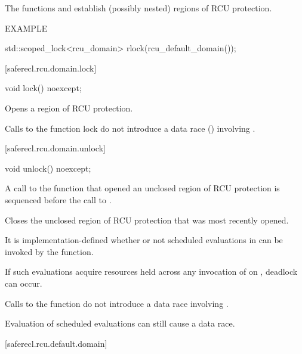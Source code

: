 The functions  and  establish (possibly nested)
regions of RCU protection.

EXAMPLE
\begin{codeblock}
std::scoped_lock<rcu_domain> rlock(rcu_default_domain());
\end{codeblock}

[saferecl.rcu.domain.lock]{}

\begin{itemdecl}
void lock() noexcept;
\end{itemdecl}

\begin{itemdescr}

\effects
Opens a region of RCU protection.

\remarks
Calls to the function lock do not introduce a data race
() involving .

\end{itemdescr}

[saferecl.rcu.domain.unlock]{}

\begin{itemdecl}
void unlock() noexcept;
\end{itemdecl}

\begin{itemdescr}

\expects
A call to the function  that opened
an unclosed region of RCU protection is sequenced before the
call to .

\effects
Closes the unclosed region of RCU protection that was
most recently opened.

\remarks
It is implementation-defined whether or not scheduled
evaluations in  can be invoked by the 
function.
\begin{note}
If such evaluations acquire resources held across any invocation
of  on , deadlock can occur.\end{note}
Calls to the function  do not introduce a data race
involving .
\begin{note}
Evaluation of scheduled evaluations can still cause a data race.\end{note}

\end{itemdescr}

[saferecl.rcu.default.domain]{}

